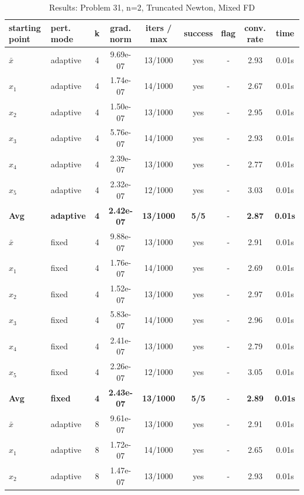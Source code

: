 \begin{longtable}{|l|l|c|c|c|c|c|c|c|}
\caption{Results: Problem 31, n=2, Truncated Newton, Mixed FD} \\
\hline
\textbf{starting point} & \textbf{pert. mode} & \textbf{k} & \textbf{grad. norm} & \textbf{iters / max} & \textbf{success} & \textbf{flag} & \textbf{conv. rate} & \textbf{time} \\
\hline
\endfirsthead
\endhead
\endfoot
\hline
\endlastfoot
$\bar{x}$ & adaptive & 4 & 9.69e-07 & 13/1000 & yes & - & 2.93 & 0.01s \\
\hline
$x_1$ & adaptive & 4 & 1.74e-07 & 14/1000 & yes & - & 2.67 & 0.01s \\
\hline
$x_2$ & adaptive & 4 & 1.50e-07 & 13/1000 & yes & - & 2.95 & 0.01s \\
\hline
$x_3$ & adaptive & 4 & 5.76e-07 & 14/1000 & yes & - & 2.93 & 0.01s \\
\hline
$x_4$ & adaptive & 4 & 2.39e-07 & 13/1000 & yes & - & 2.77 & 0.01s \\
\hline
$x_5$ & adaptive & 4 & 2.32e-07 & 12/1000 & yes & - & 3.03 & 0.01s \\
\hline
\hline\hline
\textbf{Avg} & \textbf{adaptive} & \textbf{4} & \textbf{2.42e-07} & \textbf{13/1000} & \textbf{5/5} & - & \textbf{2.87} & \textbf{0.01s} \\
\hline\hline
\hline
$\bar{x}$ & fixed & 4 & 9.88e-07 & 13/1000 & yes & - & 2.91 & 0.01s \\
\hline
$x_1$ & fixed & 4 & 1.76e-07 & 14/1000 & yes & - & 2.69 & 0.01s \\
\hline
$x_2$ & fixed & 4 & 1.52e-07 & 13/1000 & yes & - & 2.97 & 0.01s \\
\hline
$x_3$ & fixed & 4 & 5.83e-07 & 14/1000 & yes & - & 2.96 & 0.01s \\
\hline
$x_4$ & fixed & 4 & 2.41e-07 & 13/1000 & yes & - & 2.79 & 0.01s \\
\hline
$x_5$ & fixed & 4 & 2.26e-07 & 12/1000 & yes & - & 3.05 & 0.01s \\
\hline
\hline\hline
\textbf{Avg} & \textbf{fixed} & \textbf{4} & \textbf{2.43e-07} & \textbf{13/1000} & \textbf{5/5} & - & \textbf{2.89} & \textbf{0.01s} \\
\hline\hline
$\bar{x}$ & adaptive & 8 & 9.61e-07 & 13/1000 & yes & - & 2.91 & 0.01s \\
\hline
$x_1$ & adaptive & 8 & 1.72e-07 & 14/1000 & yes & - & 2.65 & 0.01s \\
\hline
$x_2$ & adaptive & 8 & 1.47e-07 & 13/1000 & yes & - & 2.93 & 0.01s \\

\end{longtable}
